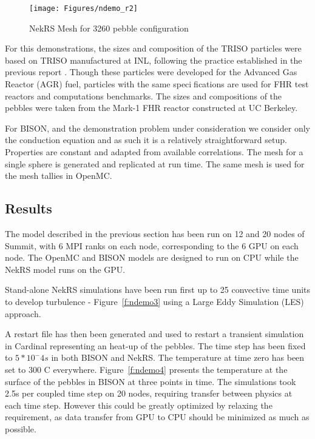 \begin{figure}[!h]
\centering
\texttt{[image: Figures/ndemo\_r2]}
\caption{NekRS Mesh for 3260 pebble configuration}
\label{f:ndemo2}
\end{figure}

For this demonstrations, the sizes and composition of the TRISO particles were based on TRISO manufactured
at INL, following the practice established in the previous report \cite{cardinal}. Though these particles were developed for the Advanced Gas Reactor (AGR) fuel, particles with the same specifications are used for FHR test reactors and computations benchmarks. The sizes and compositions of the pebbles were taken from the Mark-1 FHR reactor constructed at UC Berkeley.

For BISON, and the demonstration problem under consideration we consider only the conduction equation and as such it is a relatively straightforward setup. Properties are constant and adapted from available correlations. The mesh for a single sphere is generated and replicated at run time. The same mesh is used for the mesh tallies in OpenMC.

\subsection{Results}

The model described in the previous section has been run on 12 and 20 nodes of Summit, with 6 MPI ranks on each node, corresponding to the 6 GPU on each node. The OpenMC and BISON models are designed to run on CPU while the NekRS model runs on the GPU.

Stand-alone NekRS simulations have been run first up to 25 convective time units to develop turbulence - Figure~\ref{f:ndemo3} using a Large Eddy Simulation (LES) approach.

 A restart file has then been generated and used to restart a transient simulation in Cardinal representing an heat-up of the pebbles. The time step has been fixed to $5*10^-4 s$ in both BISON and NekRS. The temperature at time zero has been set to 300 C everywhere. Figure~\ref{f:ndemo4} presents the temperature at the surface of the pebbles in BISON at three points in time. The simulations took 2.5s per coupled time step on 20 nodes, requiring transfer between physics at each time step. However this could be greatly optimized by relaxing the requirement, as data transfer from GPU to CPU should be minimized as much as possible.

